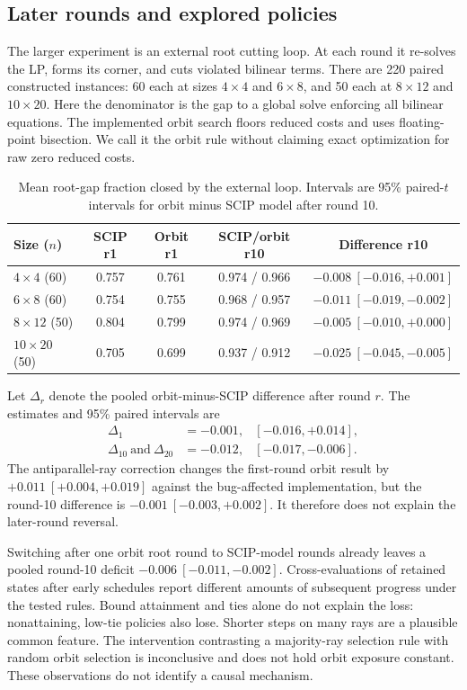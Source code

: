\subsection{Later rounds and explored policies}
\label{exp:multiround}

The larger experiment is an external root cutting loop. At each round
it re-solves the LP, forms its corner, and cuts violated bilinear terms.
There are 220 paired constructed instances: 60 each at sizes $4\times4$
and $6\times8$, and 50 each at $8\times12$ and $10\times20$.
Here the denominator is the gap to a global solve enforcing all bilinear
equations. The implemented orbit search floors reduced costs and uses
floating-point bisection. We call it the orbit rule without claiming exact
optimization for raw zero reduced costs.

\begin{table}[t]
\centering
\caption{Mean root-gap fraction closed by the external loop. Intervals
are 95\% paired-$t$ intervals for orbit minus SCIP model after round 10.}
\label{exp:multiround-table}
\small
\begin{tabular}{@{}lcccc@{}}
\toprule
Size ($n$) & SCIP r1 & Orbit r1 & SCIP/orbit r10 & Difference r10 \\
\midrule
$4\times4$ (60) & 0.757 & 0.761 & 0.974 / 0.966 & $-0.008\ [-0.016,+0.001]$ \\
$6\times8$ (60) & 0.754 & 0.755 & 0.968 / 0.957 & $-0.011\ [-0.019,-0.002]$ \\
$8\times12$ (50) & 0.804 & 0.799 & 0.974 / 0.969 & $-0.005\ [-0.010,+0.000]$ \\
$10\times20$ (50) & 0.705 & 0.699 & 0.937 / 0.912 & $-0.025\ [-0.045,-0.005]$ \\
\bottomrule
\end{tabular}
\end{table}

Let $\Delta_r$ denote the pooled orbit-minus-SCIP difference after round $r$.
The estimates and 95\% paired intervals are
\begin{align*}
\Delta_1&=-0.001, &[-0.016,+0.014],\\
\Delta_{10}\ \text{and}\ \Delta_{20}&=-0.012, &[-0.017,-0.006].
\end{align*}
The antiparallel-ray correction changes the first-round orbit result by
$+0.011\ [+0.004,+0.019]$ against the bug-affected implementation, but
the round-10 difference is $-0.001\ [-0.003,+0.002]$.
It therefore does not explain the later-round reversal.

Switching after one orbit root round to SCIP-model rounds already leaves
a pooled round-10 deficit $-0.006\ [-0.011,-0.002]$. Cross-evaluations
of retained states after early schedules report different amounts of
subsequent progress under the tested rules. Bound attainment and ties
alone do not explain the loss:
nonattaining, low-tie policies also lose. Shorter steps on many rays are
a plausible common feature. The intervention contrasting a majority-ray
selection rule with random orbit selection is inconclusive and does not
hold orbit exposure constant. These observations do not identify a causal
mechanism.

